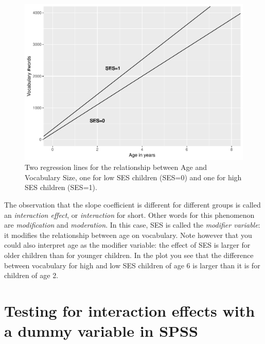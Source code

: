 \documentclass[]{report}\usepackage[]{graphicx}\usepackage[]{color}
\makeatletter
\def\maxwidth{ %
  \ifdim\Gin@nat@width>\linewidth
    \linewidth
  \else
    \Gin@nat@width
  \fi
}
\newenvironment{knitrout}{}{} %
\makeatother
\begin{document}
\begin{knitrout}
\color{fgcolor}\begin{figure}
\includegraphics[width=\maxwidth]{figure/summary_plot-1} \caption[Two regression lines for the relationship between Age and Vocabulary Size, one for low SES children (SES=0) and one for high SES children (SES=1)]{Two regression lines for the relationship between Age and Vocabulary Size, one for low SES children (SES=0) and one for high SES children (SES=1).}\label{fig:summary_plot}
\end{figure}


\end{knitrout}


The observation that the slope coefficient is different for different groups is called an \textit{interaction effect}, or \textit{interaction} for short. Other words for this phenomenon are \textit{modification} and \textit{moderation}. In this case, SES is called the \textit{modifier variable}: it modifies the relationship between age on vocabulary. Note however that you could also interpret age as the modifier variable: the effect of SES is larger for older children than for younger children. In the plot you see that the difference between vocabulary for high and low SES children of age 6 is larger than it is for children of age 2.


\section{Testing for interaction effects with a dummy variable in SPSS}
\end{document}
